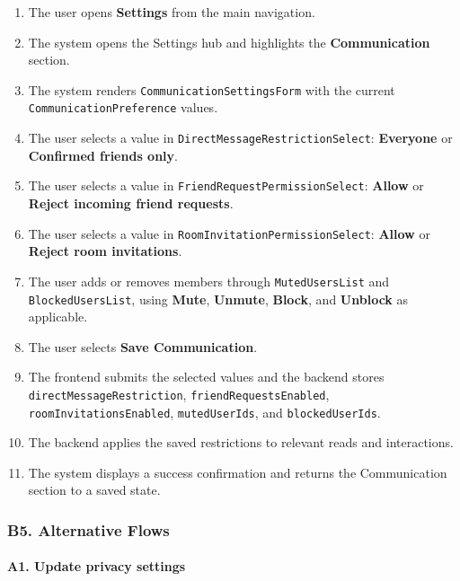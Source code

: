 \documentclass[12pt]{article}
\begin{document}
\begin{enumerate}
\item The user opens \textbf{Settings} from the main navigation.
\item The system opens the Settings hub and highlights the \textbf{Communication} section.
\item The system renders \texttt{CommunicationSettingsForm} with the current \texttt{CommunicationPreference} values.
\item The user selects a value in \texttt{DirectMessageRestrictionSelect}: \textbf{Everyone} or \textbf{Confirmed friends only}.
\item The user selects a value in \texttt{FriendRequestPermissionSelect}: \textbf{Allow} or \textbf{Reject incoming friend requests}.
\item The user selects a value in \texttt{RoomInvitationPermissionSelect}: \textbf{Allow} or \textbf{Reject room invitations}.
\item The user adds or removes members through \texttt{MutedUsersList} and \texttt{BlockedUsersList}, using \textbf{Mute}, \textbf{Unmute}, \textbf{Block}, and \textbf{Unblock} as applicable.
\item The user selects \textbf{Save Communication}.
\item The frontend submits the selected values and the backend stores \texttt{directMessageRestriction}, \texttt{friendRequestsEnabled}, \texttt{roomInvitationsEnabled}, \texttt{mutedUserIds}, and \texttt{blockedUserIds}.
\item The backend applies the saved restrictions to relevant reads and interactions.
\item The system displays a success confirmation and returns the Communication section to a saved state.
\end{enumerate}
\par\medskip

\hypertarget{sec:b5-alternative-flows}{}
\subsubsection*{B5. Alternative Flows}
\par\medskip

\hypertarget{sec:a1-update-privacy-settings}{}
\paragraph*{A1. Update privacy settings}
\par\medskip
\end{document}
